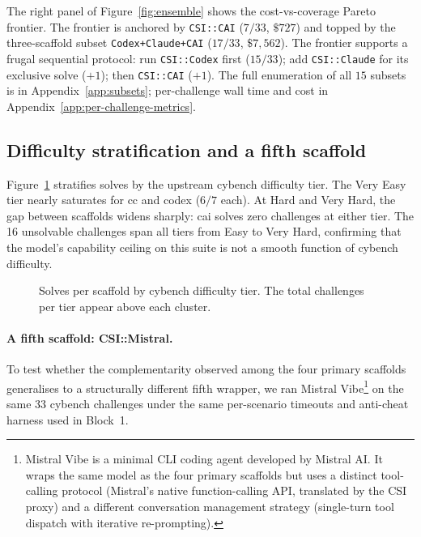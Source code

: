 The right panel of Figure~\ref{fig:ensemble} shows the cost-vs-coverage Pareto frontier. The frontier is anchored by \texttt{CSI::CAI} ($7/33$, $\$727$) and topped by the three-scaffold subset \texttt{Codex+Claude+CAI} ($17/33$, $\$7{,}562$). The frontier supports a frugal sequential protocol: run \texttt{CSI::Codex} first ($15/33$); add \texttt{CSI::Claude} for its exclusive solve ($+1$); then \texttt{CSI::CAI} ($+1$). The full enumeration of all $15$ subsets is in Appendix~\ref{app:subsets}; per-challenge wall time and cost in Appendix~\ref{app:per-challenge-metrics}.

\subsection{Difficulty stratification and a fifth scaffold}\label{sec:tiers}

Figure~\ref{fig:difficulty} stratifies solves by the upstream cybench difficulty tier. The Very Easy tier nearly saturates for cc and codex ($6/7$ each). At Hard and Very Hard, the gap between scaffolds widens sharply: cai solves zero challenges at either tier. The 16 unsolvable challenges span all tiers from Easy to Very Hard, confirming that the model's capability ceiling on this suite is not a smooth function of cybench difficulty.

\begin{figure}[t]
\centering
\resizebox{0.96\textwidth}{!}{}
\caption{Solves per scaffold by cybench difficulty tier. The total challenges per tier appear above each cluster.}
\label{fig:difficulty}
\end{figure}


\paragraph{A fifth scaffold: CSI::Mistral.}\label{sec:mistral}

To test whether the complementarity observed among the four primary scaffolds generalises to a structurally different fifth wrapper, we ran Mistral Vibe\footnote{Mistral Vibe is a minimal CLI coding agent developed by Mistral AI. It wraps the same \aliasmini{} model as the four primary scaffolds but uses a distinct tool-calling protocol (Mistral's native function-calling API, translated by the CSI proxy) and a different conversation management strategy (single-turn tool dispatch with iterative re-prompting).} on the same 33 cybench challenges under the same per-scenario timeouts and anti-cheat harness used in Block~1.

